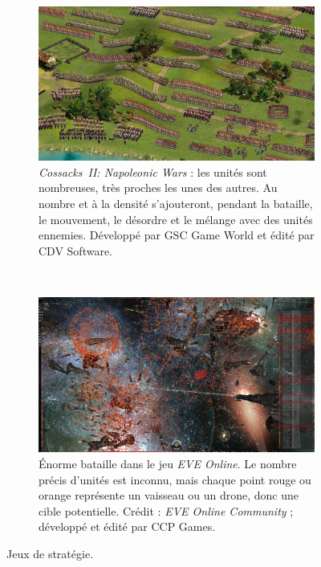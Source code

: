 \begin{appendices}
	\begin{figure}[!htbp]
		\begin{subfigure}[t]{\textwidth}
			\centering
			\includegraphics[width=\textwidth]{figures/ch1/cossacks2}
			\caption[Un RTS avec de très nombreuses unités : \emph{Cossacks~II: Napoleonic Wars}]{\emph{Cossacks~II: Napoleonic Wars} : les unités sont nombreuses, très proches les unes des autres. Au nombre et à la densité s'ajouteront, pendant la bataille, le mouvement, le désordre et le mélange avec des unités ennemies. Développé par GSC Game World et édité par CDV Software.}
			\label{fig:cossacks2}
		\end{subfigure}
		~
		\begin{subfigure}[t]{\textwidth}
			\centering
			\includegraphics[width=\textwidth]{figures/ch1/eveonline}
			\caption[Énorme bataille dans le jeu \emph{EVE Online}]{Énorme bataille dans le jeu \emph{EVE Online}. Le nombre précis d'unités est inconnu, mais chaque point rouge ou orange représente un vaisseau ou un drone, donc une cible potentielle. Crédit : \emph{EVE Online Community} ; développé et édité par CCP Games.}
			\label{fig:eveonline}
		\end{subfigure}
		\caption[Jeux de stratégie]{Jeux de stratégie.}
		\label{fig:stratGames}
	\end{figure}
	

\end{appendices}

